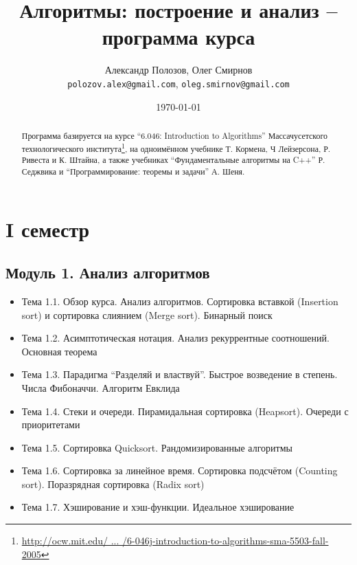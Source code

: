 \documentclass[a4paper,11pt]{article}
\author{Александр Полозов, Олег Смирнов\\
\texttt{polozov.alex@gmail.com}, \texttt{oleg.smirnov@gmail.com}}
\date{\today}
\title{Алгоритмы: построение и анализ -- программа курса}
\begin{document}
\begin{abstract}
Программа базируется на курсе ``6.046: Introduction to Algorithms'' 
Массачусетского технологического института\footnote{\href{http://goo.gl/jIOiq}
{http://ocw.mit.edu/ ... /6-046j-introduction-to-algorithms-sma-5503-fall-2005}},
на одноимённом учебнике Т. Кормена, Ч Лейзерсона, Р. Ривеста и К. Штайна,
а также учебниках ``Фундаментальные алгоритмы на C++'' Р. Седжвика и
``Программирование: теоремы и задачи'' А. Шеня.
\end{abstract}
\section*{I семестр}
\subsection*{Модуль 1. Анализ алгоритмов}
\begin{itemize}
\item Тема 1.1. Обзор курса. Анализ алгоритмов. Сортировка вставкой
(Insertion sort) и сортировка слиянием (Merge sort). Бинарный поиск
\item Тема 1.2. Асимптотическая нотация. Анализ рекуррентные соотношений.
Основная теорема
\item Тема 1.3. Парадигма ``Разделяй и властвуй''. Быстрое возведение в степень.
Числа Фибоначчи. Алгоритм Евклида
\item Тема 1.4. Стеки и очереди. Пирамидальная сортировка (Heapsort).
Очереди с приоритетами
\item Тема 1.5. Сортировка Quicksort. Рандомизированные алгоритмы
\item Тема 1.6. Сортировка за линейное время. Сортировка подсчётом
(Counting sort). Поразрядная сортировка (Radix sort)
\item Тема 1.7. Хэширование и хэш-функции. Идеальное хэширование
\end{itemize}
\end{document}
